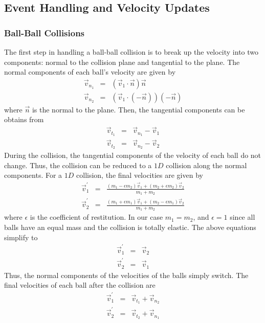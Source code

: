     \subsection{Event Handling and Velocity Updates}
        \subsubsection{Ball-Ball Collisions}
        The first step in handling a ball-ball collision is to break up the velocity into two components: normal to the collision plane
        and tangential to the plane. The normal components of each ball's velocity are given by
        \begin{eqnarray}
            \vec v_{n_1} &=& (\vec v_1 \cdot \vec n) \vec n       \nonumber \\
            \vec v_{n_2} &=& (\vec v_1 \cdot (-\vec n)) (-\vec n) \nonumber
        \end{eqnarray}
        where $\vec n$ is the normal to the plane. Then, the tangential components can be obtains from
        \begin{eqnarray}
            \vec v_{t_1} &=& \vec v_{n_1} - \vec v_1    \nonumber   \\
            \vec v_{t_2} &=& \vec v_{n_2} - \vec v_2    \nonumber
        \end{eqnarray}
        During the collision, the tangential components of the velocity of each ball do not change. Thus, the collision can be
        reduced to a $1D$ collision along the normal components. For a $1D$ collision, the final velocities are given by
        \begin{eqnarray}
            \vec v_1^\prime &=& \frac{(m_1 - \epsilon m_2) \vec v_1 + (m_2 + \epsilon m_2) \vec v_2}{m_1 + m_2}   \nonumber \\
            \vec v_2^\prime &=& \frac{(m_1 + \epsilon m_1) \vec v_1 + (m_2 - \epsilon m_1) \vec v_2}{m_1 + m_2}   \nonumber
        \end{eqnarray}
        where $\epsilon$ is the coefficient of restitution. In our case $m_1 = m_2$, and $\epsilon = 1$ since all balls have
        an equal mass and the collision is totally elastic. The above equations simplify to
        \begin{eqnarray}
            \vec v_1^\prime &=& \vec v_2    \nonumber   \\
            \vec v_2^\prime &=& \vec v_1    \nonumber
        \end{eqnarray}
        Thus, the normal components of the velocities of the balls simply switch. The final velocities of each ball after the collision are
        \begin{eqnarray}
            \vec v_1^\prime &=& \vec v_{t_1} + \vec v_{n_2} \nonumber   \\
            \vec v_2^\prime &=& \vec v_{t_2} + \vec v_{n_1} \label{equ:after_ball_ball}
        \end{eqnarray}
        

